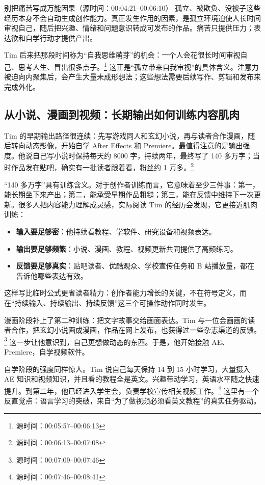 \documentclass[a4paper]{article}
\begin{document}
\begin{warningbox}{别把痛苦写成万能因果（源时间：00:04:21--00:06:10）}
孤立、被欺负、没被子这些经历本身不会自动生成创作能力。真正发生作用的因素，是孤立环境迫使人长时间审视自己，随后把兴趣、情绪和问题意识转成可发布的作品。痛苦只提供压力；表达欲和自学行动才提供产出。
\end{warningbox}

Tim 后来把那段时间称为“自我思维萌芽”的机会：一个人会花很长时间审视自己、思考人生、冒出很多点子。\footnote{源时间：00:05:57--00:06:13} 这正是“孤立带来自我审视”的具体含义。注意力被迫向内聚集后，会产生大量未成形想法；这些想法需要后续写作、剪辑和发布来完成外化。

\subsection{从小说、漫画到视频：长期输出如何训练内容肌肉}

Tim 的早期输出路径很连续：先写游戏同人和玄幻小说，再与读者合作漫画，随后转向动态影像，开始自学 After Effects 和 Premiere。最值得注意的是输出强度。他说自己写小说时保持每天约 8000 字，持续两年，最终写了 140 多万字；当时作品发在贴吧，确实有一批读者跟着看，粉丝约 1 万多。\footnote{源时间：00:06:13--00:07:08}

“140 多万字”具有训练含义。对于创作者训练而言，它意味着至少三件事：第一，能长期坐下来产出；第二，能承受早期作品粗糙；第三，能在反馈中维持下一次更新。很多人把内容能力理解成灵感，实际阅读 Tim 的经历会发现，它更接近肌肉训练：

\begin{itemize}
  \item \textbf{输入要足够密}：他持续看教程、学软件、研究设备和视频表达。
  \item \textbf{输出要足够频繁}：小说、漫画、教程、视频更新共同提供了高频练习。
  \item \textbf{反馈要足够真实}：贴吧读者、优酷观众、学校宣传任务和 B 站播放量，都在告诉他哪些表达有效。
\end{itemize}

这样写比临时公式更省读者精力：创作者能力增长的关键，不在符号定义，而在“持续输入、持续输出、持续反馈”这三个可操作动作同时发生。

漫画阶段补上了第二种训练：把文字故事交给画面表达。Tim 与一位会画画的读者合作，把玄幻小说画成漫画，作品在网上发布，也获得过一些杂志渠道的反馈。\footnote{源时间：00:07:09--00:07:46} 这一步让他意识到，自己更想做动态的东西。于是，他开始接触 AE、Premiere，自学视频软件。

自学阶段的强度同样惊人。Tim 说自己每天保持 14 到 15 小时学习，大量摄入 AE 知识和视频知识，并且看的教程全是英文。兴趣带动学习，英语水平随之快速提升。到第二年，他已经进入学生会，负责学校宣传相关视频工作。\footnote{源时间：00:07:46--00:08:41} 这里有一个反直觉点：语言学习的突破，来自“为了做视频必须看英文教程”的真实任务驱动。
\end{document}
